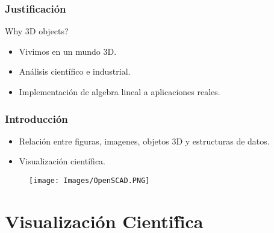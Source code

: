 \documentclass{beamer}
\begin{document}

\begin{frame}
\frametitle{Justificaci\' on}
Why 3D objects?
\begin{itemize}
\item Vivimos en un mundo 3D. 
\item An\' alisis cient\' ifico e industrial.
\item Implementaci\' on de algebra lineal a aplicaciones reales.
\end{itemize}
\end{frame}

\begin{frame}
\frametitle{Introducción}
\begin{itemize}
\item Relaci\' on entre figuras, imagenes, objetos 3D y estructuras de datos.
\item Visualizaci\' on cient\' ifica.
\end{itemize}

\begin{figure}[h]
\texttt{[image: Images/OpenSCAD.PNG]}
\centering
\end{figure}
\end{frame}

\section{Visualizaci\' on Cienti\' fica}
\end{document}

